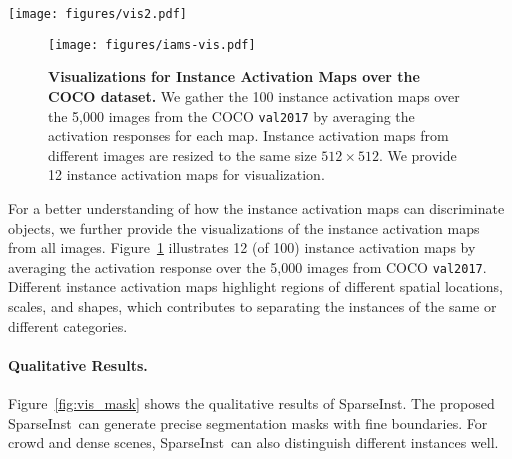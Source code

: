 \documentclass[10pt,twocolumn,letterpaper]{article}
\newcommand{\name}{SparseInst}
\begin{document}
\begin{figure*}[htbp]
    \centering
    \texttt{[image: figures/vis2.pdf]}
    \vspace{-5pt}
    \caption{\textbf{Visualizations for Instance Segmentation.} The results are obtained by \name{} on COCO \texttt{val2017}. The confidence threshold is set to 0.4. We can observe that \name~can generate precise boundaries, highlight and segment well on the crowd scenes, and cope with the scale-variant segmentation.}
    \vspace{-5pt}
    \label{fig:vis_mask}
\end{figure*}


\begin{figure}[]
\centering
\texttt{[image: figures/iams-vis.pdf]}
\caption{\textbf{Visualizations for Instance Activation Maps over the COCO dataset.} We gather the 100 instance activation maps over the 5,000 images from the COCO \texttt{val2017} by averaging the activation responses for each map. Instance activation maps from different images are resized to the same size $512\times512$. We provide 12 instance activation maps for visualization.}
\label{fig:vis_iam_all}
\vspace{-10pt}
\end{figure}

For a better understanding of how the instance activation maps can discriminate objects, we further provide the visualizations of the instance activation maps from all images. Figure~\ref{fig:vis_iam_all} illustrates 12 (of 100) instance activation maps by averaging the activation response over the 5,000 images from COCO \texttt{val2017}. Different instance activation maps highlight regions of different spatial locations, scales, and shapes, which contributes to separating the instances of the same or different categories.
\paragraph{Qualitative Results.}
Figure~\ref{fig:vis_mask} shows the qualitative results of \name. The proposed \name~can generate precise segmentation masks with fine boundaries. For crowd and dense scenes, \name~can also distinguish different instances well.
\end{document}
